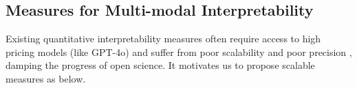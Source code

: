 


\subsection{Measures for Multi-modal Interpretability}
Existing quantitative interpretability measures \citep{bills2023language} often require access to high pricing models (like GPT-4o) and suffer from poor scalability and poor precision \citep{gao2024scaling}, damping the progress of open science. It motivates us to propose scalable measures as below.



